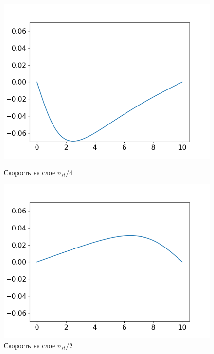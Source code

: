 \begin{figure}[h]
	\begin{minipage}[h]{0.47\linewidth}
		\centering
		\includegraphics[width=1\linewidth]{pics/task2/14u_2.png} 
		\caption{Скорость на слое $n_{st} / 4$}
	\end{minipage}
	\hfill
	\begin{minipage}[h]{0.47\linewidth}
		\centering
		\includegraphics[width=1\linewidth]{pics/task2/24u_2.png} 
		\caption{Скорость на слое $n_{st} / 2$}
	\end{minipage}
	\vfill
	\begin{minipage}[h]{0.47\linewidth}
		\centering

\end{minipage}
\end{figure}

